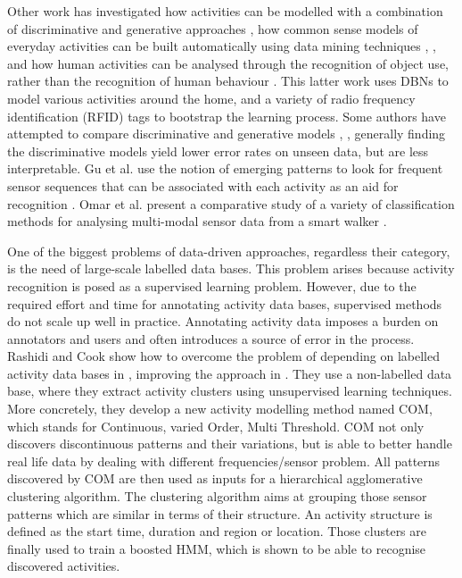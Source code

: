 Other work has investigated how activities can be modelled with a combination of discriminative and generative approaches \cite{Lester2005}, how common sense models of everyday activities can be built automatically using data mining techniques \cite{Pentney2008}, \cite{Pentney2007}, and how human activities can be analysed through the recognition of object use, rather than the recognition of human behaviour \cite{Wu2007}. This latter work uses DBNs to model various activities around the home, and a variety of radio frequency identification (RFID) tags to bootstrap the learning process. Some authors have attempted to compare discriminative and generative models \cite{Bao2004}, \cite{Ravi2005}, generally finding the discriminative models yield lower error rates on unseen data, but are less interpretable. Gu et al. use the notion of emerging patterns to look for frequent sensor sequences that can be associated with each activity as an aid for recognition \cite{Gu2009}. Omar et al. present a comparative study of a variety of classification methods for analysing multi-modal sensor data from a smart walker \cite{Omar2010}.

One of the biggest problems of data-driven approaches, regardless their category, is the need of large-scale labelled data bases. This problem arises because activity recognition is posed as a supervised learning problem. However, due to the required effort and time for annotating activity data bases, supervised methods do not scale up well in practice. Annotating activity data imposes a burden on annotators and users and often introduces a source of error in the process. Rashidi and Cook show how to overcome the problem of depending on labelled activity data bases in \cite{Rashidi2011}, improving the approach in \cite{Rashidi2013}. They use a non-labelled data base, where they extract activity clusters using unsupervised learning techniques. More concretely, they develop a new activity modelling method named COM, which stands for Continuous, varied Order, Multi Threshold. COM not only discovers discontinuous patterns and their variations, but is able to better handle real life data by dealing with different frequencies/sensor problem. All patterns discovered by COM are then used as inputs for a hierarchical agglomerative clustering algorithm. The clustering algorithm aims at grouping those sensor patterns which are similar in terms of their structure. An activity structure is defined as the start time, duration and region or location. Those clusters are finally used to train a boosted HMM, which is shown to be able to recognise discovered activities. 

